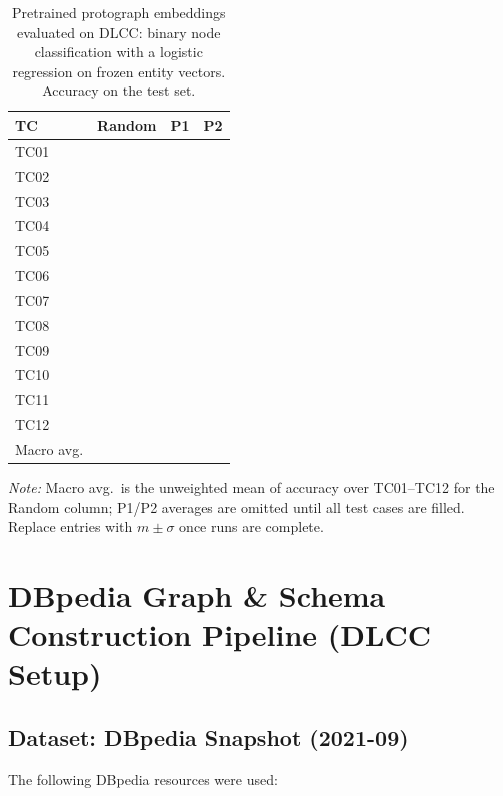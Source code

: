 \documentclass[a4paper,oneside,bibliography=totoc]{scrartcl}
\begin{document}
\begingroup
\newcommand{\D}{\textemdash{}}
\begin{table}[t]
  \centering
  \caption{Pretrained protograph embeddings evaluated on DLCC: binary node classification with a logistic regression on frozen entity vectors. Accuracy on the test set.}
  \label{tab:dlcc-protograph-embeddings-eval}
  \footnotesize
  \setlength{\tabcolsep}{4pt}
  \begin{tabular}{@{}lccc@{}}
    \toprule
    TC & Random & P1 & P2 \\
    \midrule
    TC01 & \D & \D & \D \\
    TC02 & \D & \D & \D \\
    TC03 & \D & \D & \D \\
    TC04 & \D & \D & \D \\
    TC05 & \D & \D & \D \\
    TC06 & \D & \D & \D \\
    TC07 & \D & \D & \D \\
    TC08 & \D & \D & \D \\
    TC09 & \D & \D & \D \\
    TC10 & \D & \D & \D \\
    TC11 & \D & \D & \D \\
    TC12 & \D & \D & \D \\
    \midrule
    Macro avg.
      & \D & \D & \D \\
    \bottomrule
  \end{tabular}
  \vspace{0.4em}
  \par\noindent\small\textit{Note:} Macro avg.\ is the unweighted mean of accuracy over TC01--TC12 for the Random column; P1/P2 averages are omitted until all test cases are filled. Replace entries with $m \pm \sigma$ once runs are complete.
\end{table}
\endgroup

\section{DBpedia Graph \& Schema Construction Pipeline (DLCC Setup)}

\subsection{Dataset: DBpedia Snapshot (2021-09)}

The following DBpedia resources were used: 
\end{document}
